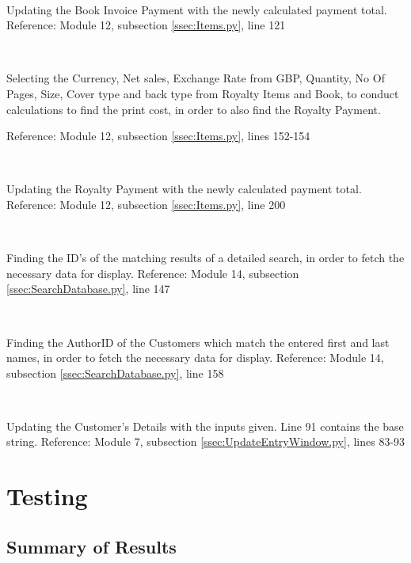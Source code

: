 \

Updating the Book Invoice Payment with the newly calculated payment total.
Reference: Module 12,  subsection \ref{ssec:Items.py}, line 121

\

Selecting the Currency, Net sales, Exchange Rate from GBP, Quantity, No Of Pages, Size, Cover type and back type from Royalty Items and Book, to conduct calculations to find the print cost, in order to also find the Royalty Payment.
\begin{tiny}
\end{tiny}
Reference: Module 12,  subsection \ref{ssec:Items.py}, lines 152-154

\

Updating the Royalty Payment with the newly calculated payment total.
Reference: Module 12,  subsection \ref{ssec:Items.py}, line 200

\

Finding the ID's of the matching results of a detailed search, in order to fetch the necessary data for display.
Reference: Module 14,  subsection \ref{ssec:SearchDatabase.py}, line 147

\

Finding the AuthorID of the Customers which match the entered first and last names, in order to fetch the necessary data for display.
Reference: Module 14,  subsection \ref{ssec:SearchDatabase.py}, line 158

\

Updating the Customer's Details with the inputs given. Line 91 contains the base string.
Reference: Module 7,  subsection \ref{ssec:UpdateEntryWindow.py}, lines 83-93


\section{Testing}

\subsection{Summary of Results}

